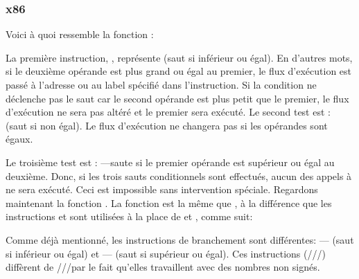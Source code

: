 \subsubsection{x86}


Voici à quoi ressemble la fonction  :




La première instruction, \JLE, représente  (saut si inférieur ou égal).
En d'autres mots, si le deuxième opérande est plus grand ou égal au premier,
le flux d'exécution est passé à l'adresse ou au label spécifié dans l'instruction.
Si la condition ne déclenche pas le saut car le second opérande est plus petit que
le premier, le flux d'exécution ne sera pas altéré et le premier \printf sera
exécuté.
Le second test est \JNE:  (saut si non égal).
Le flux d'exécution ne changera pas si les opérandes sont égaux.

Le troisième test est \JGE: ---saute si le premier
opérande est supérieur ou égal au deuxième.
Donc, si les trois sauts conditionnels sont effectués, aucun des appels à \printf
ne sera exécuté.
Ceci est impossible sans intervention spéciale.
Regardons maintenant la fonction .
La fonction  est la même que , à la différence
que les instructions \JBE et \JAE sont utilisées à la place de \JLE et \JGE, comme
suit:




Comme déjà mentionné, les instructions de branchement sont différentes:
\JBE--- (saut si inférieur ou égal) et \JAE---
(saut si supérieur ou égal).
Ces instructions (\JA/\JAE/\JB/\JBE) diffèrent de \JG/\JGE/\JL/\JLE par le fait qu'elles
travaillent avec des nombres non signés.



